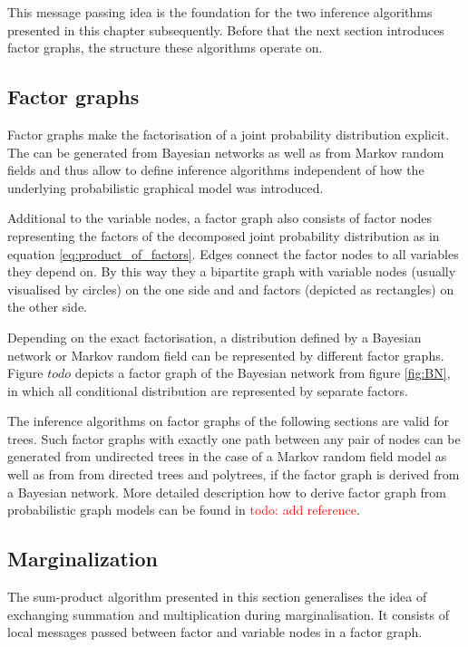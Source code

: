 \documentclass{sigkdd}
\begin{document}
This message passing idea is the foundation for the two inference algorithms presented in this chapter subsequently. Before that the next section introduces factor graphs, the structure these algorithms operate on.

\subsection{Factor graphs}
Factor graphs make the factorisation of a joint probability distribution explicit. The can be generated from Bayesian networks as well as from Markov random fields and thus allow to define inference algorithms independent of how the underlying probabilistic graphical model was introduced.

Additional to the variable nodes, a factor graph also consists of factor nodes representing the factors of the decomposed joint probability distribution as in equation  \ref{eq:product_of_factors}. Edges connect the factor nodes to all variables they depend on. By this way they a bipartite graph with variable nodes (usually visualised by circles) on the one side and and factors (depicted as rectangles) on the other side.

Depending on the exact factorisation, a distribution defined by a Bayesian network or Markov random field can be represented by different factor graphs. Figure $todo$ depicts a factor graph of the Bayesian network from figure \ref{fig:BN}, in which all conditional distribution are represented by separate factors.

The inference algorithms on factor graphs of the following sections are valid for trees. Such factor graphs with exactly one path between any pair of nodes can be generated from undirected trees in the case of a Markov random field model as well as from from directed trees and polytrees, if the factor graph is derived from a Bayesian network. More detailed description how to derive factor graph from probabilistic graph models can be found in \textcolor{red}{todo: add reference}.



\subsection{Marginalization}
The sum-product algorithm presented in this section generalises the idea of exchanging summation and multiplication during marginalisation. It consists of local messages passed between factor and variable nodes in a factor graph.
\end{document}
